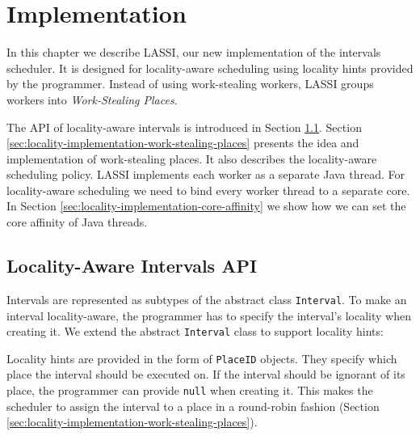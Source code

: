 
\chapter{Implementation}
\label{chap:locality-implementation}

In this chapter we describe LASSI, our new implementation of the
intervals scheduler. It is designed for locality-aware scheduling
using locality hints provided by the programmer. Instead of using
work-stealing workers, LASSI groups workers into \emph{Work-Stealing
  Places}.

The API of locality-aware intervals is introduced in Section
\ref{sec:locality-implementation-locality-aware-intervals-api}. Section
\ref{sec:locality-implementation-work-stealing-places} presents the
idea and implementation of work-stealing places. It also describes the
locality-aware scheduling policy. LASSI implements each worker as a
separate Java thread. For locality-aware scheduling we need to bind
every worker thread to a separate core. In Section
\ref{sec:locality-implementation-core-affinity} we show how we can set
the core affinity of Java threads.


\section{Locality-Aware Intervals API}
\label{sec:locality-implementation-locality-aware-intervals-api}

Intervals are represented as subtypes of the abstract class
\lstinline!Interval!. To make an interval locality-aware, the
programmer has to specify the interval's locality when creating it. We
extend the abstract \lstinline!Interval! class to support locality
hints:



Locality hints are provided in the form of \lstinline!PlaceID!
objects. They specify which place the interval should be executed
on. If the interval should be ignorant of its place, the programmer
can provide \lstinline!null! when creating it. This makes the
scheduler to assign the interval to a place in a round-robin fashion
(Section \ref{sec:locality-implementation-work-stealing-places}).

